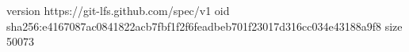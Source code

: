version https://git-lfs.github.com/spec/v1
oid sha256:e4167087ac0841822acb7fbf1f2f6feadbeb701f23017d316cc034e43188a9f8
size 50073
